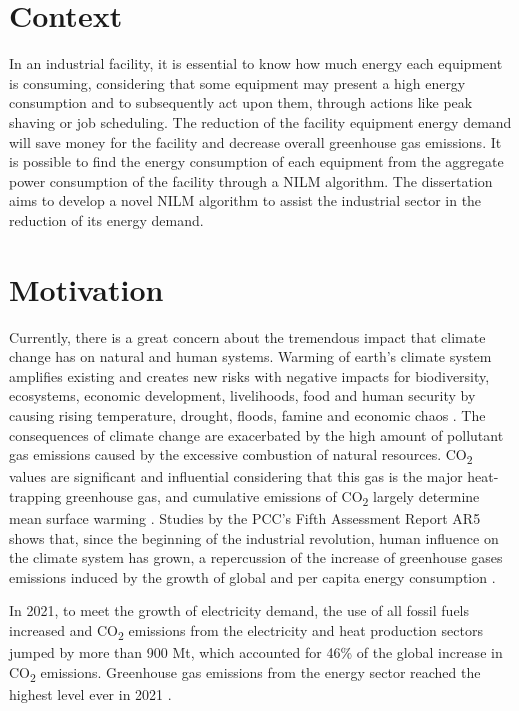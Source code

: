 
\section{Context}
In an industrial facility, it is essential to know how much energy each equipment is consuming, considering that some equipment may present a high energy consumption and to subsequently act upon them, through actions like peak shaving or job scheduling. The reduction of the facility equipment energy demand will save money for the facility and decrease overall greenhouse gas emissions.
It is possible to find the energy consumption of each equipment from the aggregate power consumption of the facility through a NILM algorithm.
The dissertation aims to develop a novel NILM algorithm to assist the industrial sector in the reduction of its energy demand.


\section{Motivation}
Currently, there is a great concern about the tremendous impact that climate change has on natural and human systems.
Warming of earth's climate system amplifies existing and creates new risks with negative impacts for biodiversity, ecosystems, economic development, livelihoods, food and human security \cite{AR5} by causing rising temperature, drought, floods, famine and economic chaos \cite{EnergySavingStrategiesIndustry}.
The consequences of climate change are exacerbated by the high amount of pollutant gas emissions caused by the excessive combustion of natural resources. CO\textsubscript{2} values are significant and influential considering that this gas is the major heat-trapping greenhouse gas, and cumulative emissions of CO\textsubscript{2} largely determine mean surface warming \cite{AR5}. Studies by the PCC’s Fifth Assessment Report AR5 \cite{AR5} shows that, since the beginning of the industrial revolution, human influence on the climate system has grown, a repercussion of the increase of greenhouse gases emissions induced by the growth of global and per capita energy consumption \cite{ReducingEnergyDemand}.

In 2021, to meet the growth of electricity demand, the use of all fossil fuels increased and CO\textsubscript{2} emissions from the electricity and heat production sectors jumped by more than 900 Mt, which accounted for 46\% of the global increase in CO\textsubscript{2} emissions. Greenhouse gas emissions from the energy sector reached the highest level ever in 2021 \cite{IEA_GlobalEnergyReview_2021}.


